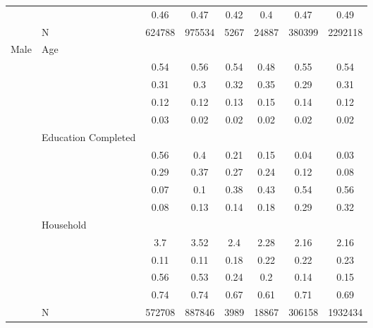 \begin{table}[ht]
\begin{tabular}{l>{\raggedright\arraybackslash}p{3.2cm}|cccccc}
   & \multicolumn{1}{>{\raggedleft\arraybackslash}p{3.4cm}|}{\makebox[3.4cm][r]{Married/Cohabiting }} & 0.46 & 0.47 & 0.42 & 0.4 & 0.47 & 0.49 \\ 
   & N & 624788 & 975534 & 5267 & 24887 & 380399 & 2292118 \\ 
  Male & Age &  &  &  &  &  &  \\ 
   & \multicolumn{1}{>{\raggedleft\arraybackslash}p{1.5cm}|}{\makebox[1.5cm][r]{60 - 69 }} & 0.54 & 0.56 & 0.54 & 0.48 & 0.55 & 0.54 \\ 
   & \multicolumn{1}{>{\raggedleft\arraybackslash}p{1.5cm}|}{\makebox[1.5cm][r]{70 - 79 }} & 0.31 & 0.3 & 0.32 & 0.35 & 0.29 & 0.31 \\ 
   & \multicolumn{1}{>{\raggedleft\arraybackslash}p{1.5cm}|}{\makebox[1.5cm][r]{80 - 89 }} & 0.12 & 0.12 & 0.13 & 0.15 & 0.14 & 0.12 \\ 
   & \multicolumn{1}{>{\raggedleft\arraybackslash}p{1.5cm}|}{\makebox[1.5cm][r]{90 plus }} & 0.03 & 0.02 & 0.02 & 0.02 & 0.02 & 0.02 \\ 
   & Education Completed &  &  &  &  &  &  \\ 
   & \multicolumn{1}{>{\raggedleft\arraybackslash}p{3.2cm}|}{\makebox[3.2cm][r]{Less than Primary }} & 0.56 & 0.4 & 0.21 & 0.15 & 0.04 & 0.03 \\ 
   & \multicolumn{1}{>{\raggedleft\arraybackslash}p{1.7cm}|}{\makebox[1.7cm][r]{Primary }} & 0.29 & 0.37 & 0.27 & 0.24 & 0.12 & 0.08 \\ 
   & \multicolumn{1}{>{\raggedleft\arraybackslash}p{2cm}|}{\makebox[2cm][r]{Secondary }} & 0.07 & 0.1 & 0.38 & 0.43 & 0.54 & 0.56 \\ 
   & \multicolumn{1}{>{\raggedleft\arraybackslash}p{2cm}|}{\makebox[2cm][r]{University }} & 0.08 & 0.13 & 0.14 & 0.18 & 0.29 & 0.32 \\ 
   & Household &  &  &  &  &  &  \\ 
   & \multicolumn{1}{>{\raggedleft\arraybackslash}p{2.7cm}|}{\makebox[2.7cm][r]{Household Size }} & 3.7 & 3.52 & 2.4 & 2.28 & 2.16 & 2.16 \\ 
   & \multicolumn{1}{>{\raggedleft\arraybackslash}p{2.2cm}|}{\makebox[2.2cm][r]{Lives Alone }} & 0.11 & 0.11 & 0.18 & 0.22 & 0.22 & 0.23 \\ 
   & \multicolumn{1}{>{\raggedleft\arraybackslash}p{2.9cm}|}{\makebox[2.9cm][r]{Lives with Child }} & 0.56 & 0.53 & 0.24 & 0.2 & 0.14 & 0.15 \\ 
   & \multicolumn{1}{>{\raggedleft\arraybackslash}p{3.4cm}|}{\makebox[3.4cm][r]{Married/Cohabiting }} & 0.74 & 0.74 & 0.67 & 0.61 & 0.71 & 0.69 \\ 
   & N & 572708 & 887846 & 3989 & 18867 & 306158 & 1932434 \\ 
   \hline
\end{tabular}
\endgroup
\end{table}
